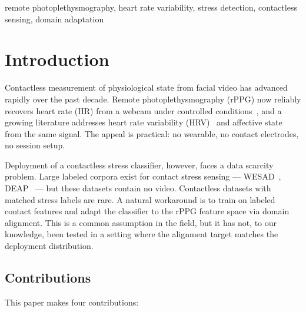 \documentclass[conference]{IEEEtran}
\begin{document}
\begin{IEEEkeywords}
remote photoplethysmography, heart rate variability, stress detection,
contactless sensing, domain adaptation
\end{IEEEkeywords}

\section{Introduction}

Contactless measurement of physiological state from facial video has
advanced rapidly over the past decade. Remote photoplethysmography
(rPPG) now reliably recovers heart rate (HR) from a webcam under
controlled conditions~\cite{verkruysse2008, dehaan2013, wang2017}, and
a growing literature addresses heart rate variability
(HRV)~\cite{mcduff2017, yan2019} and affective
state~\cite{meziati2021} from the same signal. The appeal is
practical: no wearable, no contact electrodes, no session setup.

Deployment of a contactless stress classifier, however, faces a data
scarcity problem. Large labeled corpora exist for contact stress
sensing --- WESAD~\cite{schmidt2018}, DEAP~\cite{koelstra2012} --- but
these datasets contain no video. Contactless datasets with matched
stress labels are rare. A natural workaround is to train on labeled
contact features and adapt the classifier to the rPPG feature space
via domain alignment. This is a common assumption in the field, but it
has not, to our knowledge, been tested in a setting where the
alignment target matches the deployment distribution.

\subsection{Contributions}

This paper makes four contributions:
\end{document}
